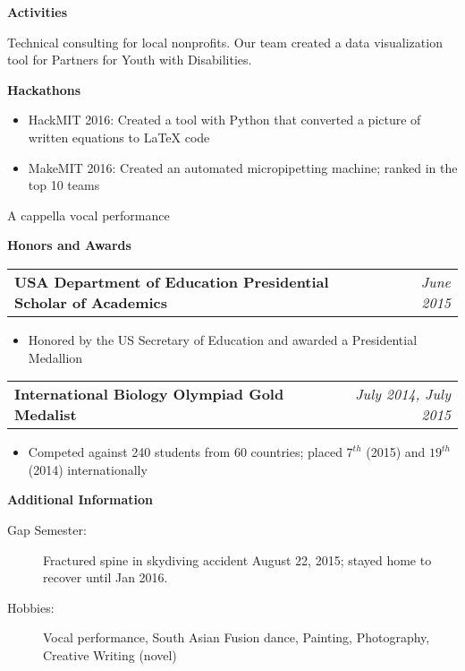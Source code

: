 \documentclass[letterpaper,10pt]{article}
\makeatletter
\newcommand{\resitem}[1]{\item #1 \vspace{-2pt}}
\newcommand{\resheading}[1]{{\large \colorbox{mygrey}{\begin{minipage}{\textwidth}{\textbf{#1 \vphantom{p\^{E}}}}\end{minipage}}}}
\newcommand{\resawards}[2]{
\begin{tabular*}{7.4in}{l@{\extracolsep{\fill}}r}
        \textbf{#1} & \textit{#2} \\
\end{tabular*}\vspace{-6pt}}
\makeatother
\begin{document}
\resheading{Activities}

\begin{description}

\item[Code For Good (MIT):]
Technical consulting for local nonprofits. Our team created a data visualization tool for Partners for Youth with Disabilities.

\item

\textbf{Hackathons}

\vspace{-7pt}

    \begin{itemize}[leftmargin=-1mm]
    \resitem{HackMIT 2016: Created a tool with Python that converted a picture of written equations to LaTeX code}
    \resitem{MakeMIT 2016: Created an automated micropipetting machine; ranked in the top 10 teams}
  \end{itemize}



\item[MIT Resonance]
A cappella vocal performance
\end{description}


\resheading{Honors and Awards}

\begin{description}
\item
  \resawards{USA Department of Education Presidential Scholar of Academics}{June 2015}
  \begin{itemize}[leftmargin=-1mm]
    \resitem{Honored by the US Secretary of Education and awarded a Presidential Medallion}
  \end{itemize}

\item
  \resawards{International Biology Olympiad Gold Medalist}{July 2014, July 2015}
  \begin{itemize}[leftmargin=-1mm]
    \resitem{Competed against 240 students from 60 countries; placed $7^{th}$ (2015) and $19^{th}$ (2014) internationally}
  \end{itemize}


\end{description}

\resheading{Additional Information}

\begin{description}
\item[Gap Semester:]
Fractured spine in skydiving accident August 22, 2015; stayed home to recover until Jan 2016.
\item[Hobbies:]
Vocal performance, South Asian Fusion dance, Painting, Photography, Creative Writing (novel)
\end{description}
\end{document}
